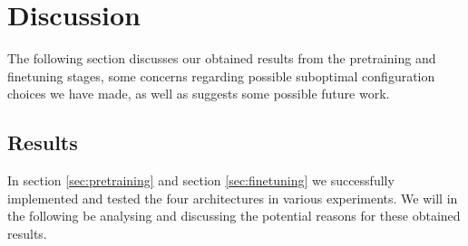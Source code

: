 \documentclass[./main.tex]{subfiles}
\begin{document}
\section{Discussion}
The following section discusses our obtained results from the pretraining and finetuning stages, some concerns regarding possible suboptimal configuration choices we have made, as well as suggests some possible future work. 

\subsection{Results}
\label{sec:results}
In section \ref{sec:pretraining} and section \ref{sec:finetuning} we successfully implemented and tested the four architectures in various experiments. We will in the following be analysing and discussing the potential reasons for these obtained results.
\end{document}
